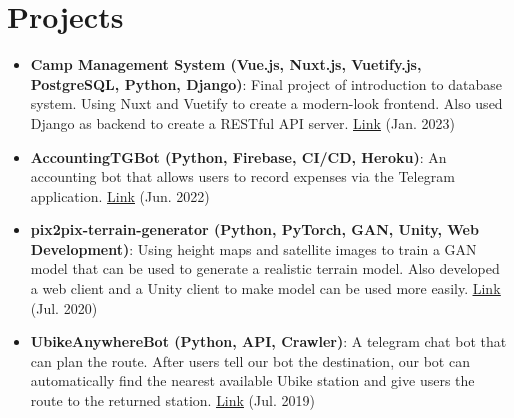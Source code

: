 \documentclass[a4paper8pt]{extarticle}
\newcommand{\resumeItem}[2]{
  \item\small{
    \textbf{#1}{: #2 \vspace{-2pt}}
  }
}
\newcommand{\resumeSubItem}[2]{\resumeItem{#1}{#2}\vspace{-3pt}}
\newcommand{\resumeSubHeadingListStart}{\begin{itemize}[leftmargin=*]}
\newcommand{\resumeSubHeadingListEnd}{\end{itemize}}
\begin{document}
\vspace{-5pt}
\section{Projects}
\resumeSubHeadingListStart
\resumeSubItem{Camp Management System (Vue.js, Nuxt.js, Vuetify.js, PostgreSQL, Python, Django)}{Final project of introduction to database system. Using Nuxt and Vuetify to create a modern-look frontend. Also used Django as backend to create a RESTful API server. \href{https://github.com/jayin92/camp-management-system}{\underline{Link}} (Jan. 2023)}
\resumeSubItem{AccountingTGBot (Python, Firebase, CI/CD, Heroku)}{An accounting bot that allows users to record expenses via the Telegram application. \href{https://github.com/jayin92/AccountingTGBot}{\underline{Link}} (Jun. 2022)}
\vspace{2pt}
\resumeSubItem{pix2pix-terrain-generator (Python, PyTorch, GAN, Unity, Web Development)}{Using height maps and satellite images to train a GAN model that can be used to generate a realistic terrain model. Also developed a web client and a Unity client to make model can be used more easily. \href{https://github.com/jayin92/pix2pix-terrain-generator}{\underline{Link}} (Jul. 2020)}
\vspace{2pt}
\resumeSubItem{UbikeAnywhereBot (Python, API, Crawler)}{A telegram chat bot that can plan the route. After users tell our bot the destination, our bot can automatically find the nearest available Ubike station and give users the route to the returned station. \href{https://github.com/jayin92/UBikeAnywhereBot}{\underline{Link}} (Jul. 2019)}
\resumeSubHeadingListEnd
\vspace{-5pt}

\end{document}
